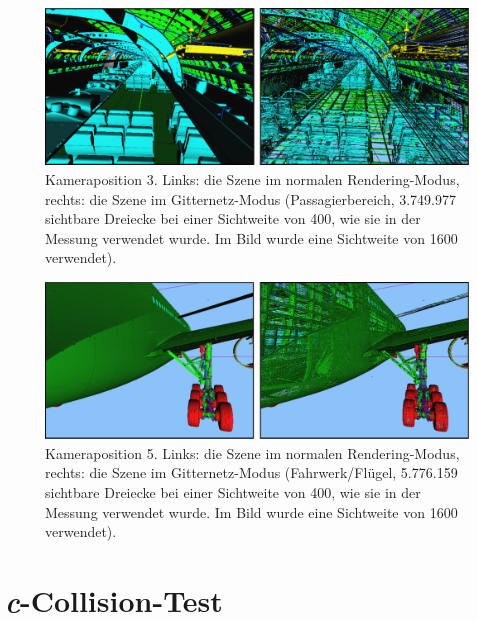 \begin{figure}
\centering
\includegraphics[scale=0.40]{images/pos3.pdf}
\caption{\label{fig:eval:pos3}Kameraposition 3. Links: die Szene im normalen Rendering-Modus, rechts: die Szene im Gitternetz-Modus (Passagierbereich, 3.749.977 sichtbare Dreiecke bei einer Sichtweite von 400, wie sie in der Messung verwendet wurde. Im Bild wurde eine Sichtweite von 1600 verwendet).}
\end{figure}

\begin{figure}
\centering
\includegraphics[scale=0.40]{images/pos5.pdf}
\caption{\label{fig:eval:pos5}Kameraposition 5. Links: die Szene im normalen Rendering-Modus, rechts: die Szene im Gitternetz-Modus (Fahrwerk/Flügel, 5.776.159 sichtbare Dreiecke bei einer Sichtweite von 400, wie sie in der Messung verwendet wurde. Im Bild wurde eine Sichtweite von 1600 verwendet).}
\end{figure}

\section{\textit{c}-Collision-Test}
\label{sec:eval:ccollision}

